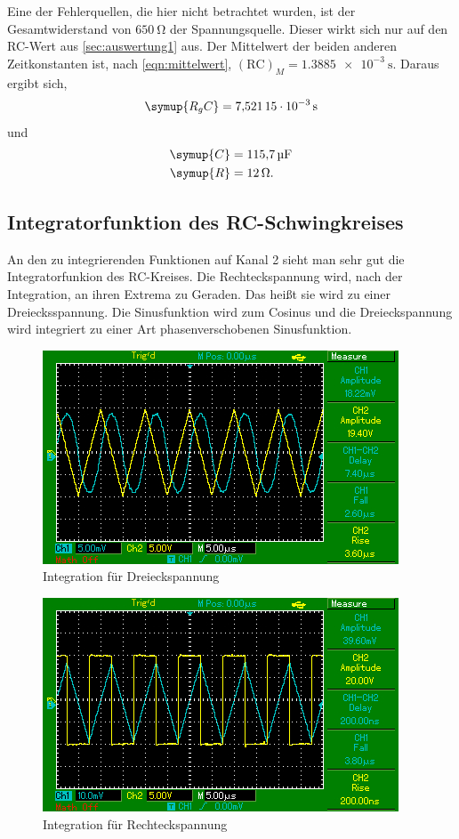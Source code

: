 Eine der Fehlerquellen, die hier nicht betrachtet wurden, ist der
Gesamtwiderstand von $\SI{650}{\ohm}$ der Spannungsquelle. Dieser wirkt sich nur
auf den RC-Wert aus \ref{sec:auswertung1} aus.
Der Mittelwert der beiden anderen Zeitkonstanten ist, nach \ref{eqn:mittelwert},
$(\text{RC})_M = \SI{1.3885e-3}{\second}$. Daraus ergibt sich,
\begin{equation*}
  \symup{R_g C} = \SI{7.52115e-3}{\second}
\end{equation*}
und
\begin{align}
  \symup{C}  &= \SI{115.7}{\micro\farad} \\
  \symup{R}  &= \SI{12}{\ohm}.
  \label{eqn:rcendlich}
\end{align}

\newpage

\subsection{Integratorfunktion des RC-Schwingkreises}
\label{sec:auswertung4}

An den zu integrierenden Funktionen auf Kanal 2 sieht man sehr gut die Integratorfunkion des RC-Kreises.
Die Rechteckspannung wird, nach der Integration, an ihren Extrema zu Geraden.
Das heißt sie wird zu einer Dreiecksspannung. Die Sinusfunktion wird zum Cosinus
und die Dreieckspannung wird integriert zu einer Art phasenverschobenen
Sinusfunktion.
\begin{figure}
  \includegraphics{content/Bilder/dreieck_integral.jpg}
  \caption{Integration für Dreieckspannung}
  \label{fig:deieckint}
\end{figure}

\begin{figure}
  \includegraphics{content/Bilder/rechteck_integral.jpg}
  \caption{Integration für Rechteckspannung}
  \label{fig:rechteckint}
\end{figure}

